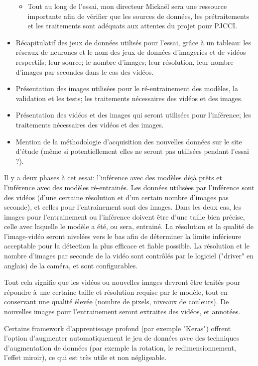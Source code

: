 \begin{itemize}
\begin{itemize}
         \item Tout au long de l'essai, mon directeur Mickaël sera une ressource importante afin de vérifier que les sources de données, les prétraitements et les traitements sont adéquats aux attentes du projet pour PJCCI.
      \end{itemize}
   \item Récapitulatif des jeux de données utilisés pour l'essai, grâce à un tableau: les réseaux de neurones et le nom des jeux de données d’imageries et de vidéos respectifs; leur source; le nombre d’images; leur résolution, leur nombre d'images par secondes dans le cas des vidéos.
   \item Présentation des images utilisées pour le ré-entrainement des modèles, la validation et les tests; les traitements nécessaires des vidéos et des images. 
   \item Présentation des vidéos et des images qui seront utilisées pour l'inférence; les traitements nécessaires des vidéos et des images.
   \item Mention de la méthodologie d'acquisition des nouvelles données sur le site d'étude (même si potentiellement elles ne seront pas utilisées pendant l'essai ?).
\end{itemize}

\par Il y a deux phases à cet essai: l'inférence avec des modèles déjà prêts et l'inférence avec des modèles ré-entrainés. Les données utilisées par l'inférence sont des vidéos (d'une certaine résolution et d'un certain nombre d'images pas seconde), et celles pour l'entrainement sont des images. Dans les deux cas, les images pour l'entrainement ou l'inférence doivent être d'une taille bien précise, celle avec laquelle le modèle a été, ou sera, entrainé. La résolution et la qualité de l'image-vidéo seront nivelées vers le bas afin de déterminer la limite inférieure acceptable pour la détection la plus efficace et fiable possible. La résolution et le nombre d'images par seconde de la vidéo sont contrôlés par le logiciel ("driver" en anglais) de la caméra, et sont configurables. 
\par Tout cela signifie que les vidéos ou nouvelles images devront être traités pour répondre à une certaine taille et résolution requise par le modèle, tout en conservant une qualité élevée (nombre de pixels, niveaux de couleurs). De nouvelles images pour l'entrainement seront extraites des vidéos, et annotées. 
\par Certains framework d'apprentissage profond (par exemple "Keras") offrent l'option d'augmenter automatiquement le jeu de données avec des techniques d'augmentation de données (par exemple la rotation, le redimensionnement, l'effet miroir), ce qui est très utile et non négligeable.

